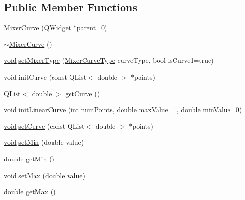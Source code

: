 \subsection*{\-Public \-Member \-Functions}
\begin{DoxyCompactItemize}
\item 
\hyperlink{group___config_plugin_ga1124f8bbbfadf0a60fe37c681a323689}{\-Mixer\-Curve} (\-Q\-Widget $\ast$parent=0)
\item 
\hyperlink{group___config_plugin_ga1ecc6d88c82c0c4403185f1741bd096c}{$\sim$\-Mixer\-Curve} ()
\item 
\hyperlink{group___u_a_v_objects_plugin_ga444cf2ff3f0ecbe028adce838d373f5c}{void} \hyperlink{group___config_plugin_ga9fbf13c7b139059e1c3b8788a937b817}{set\-Mixer\-Type} (\hyperlink{group___config_plugin_ga58a5506035df5fabbf4feffb36632595}{\-Mixer\-Curve\-Type} curve\-Type, bool is\-Curve1=true)
\item 
\hyperlink{group___u_a_v_objects_plugin_ga444cf2ff3f0ecbe028adce838d373f5c}{void} \hyperlink{group___config_plugin_ga2c2f4469e3a93a1aa88633e97073ffa1}{init\-Curve} (const \-Q\-List$<$ double $>$ $\ast$points)
\item 
\-Q\-List$<$ double $>$ \hyperlink{group___config_plugin_ga676b2baa08ec2deceb84e56ceddd9c6c}{get\-Curve} ()
\item 
\hyperlink{group___u_a_v_objects_plugin_ga444cf2ff3f0ecbe028adce838d373f5c}{void} \hyperlink{group___config_plugin_ga149a9a0d28a983db45a48ed71c35f21d}{init\-Linear\-Curve} (int num\-Points, double max\-Value=1, double min\-Value=0)
\item 
\hyperlink{group___u_a_v_objects_plugin_ga444cf2ff3f0ecbe028adce838d373f5c}{void} \hyperlink{group___config_plugin_ga0292ee7413de63e428fd0ca9ec2d0f08}{set\-Curve} (const \-Q\-List$<$ double $>$ $\ast$points)
\item 
\hyperlink{group___u_a_v_objects_plugin_ga444cf2ff3f0ecbe028adce838d373f5c}{void} \hyperlink{group___config_plugin_gae709bb34fd5b4386c7538059fd77e523}{set\-Min} (double value)
\item 
double \hyperlink{group___config_plugin_ga6d107a62e8f6d1115afbe9869d5fbf62}{get\-Min} ()
\item 
\hyperlink{group___u_a_v_objects_plugin_ga444cf2ff3f0ecbe028adce838d373f5c}{void} \hyperlink{group___config_plugin_ga122781733f46efdca9586ab7d1cb46e3}{set\-Max} (double value)
\item 
double \hyperlink{group___config_plugin_ga218856c51ab9ecff11ecfcf0f6074589}{get\-Max} ()
\item 

\end{DoxyCompactItemize}
